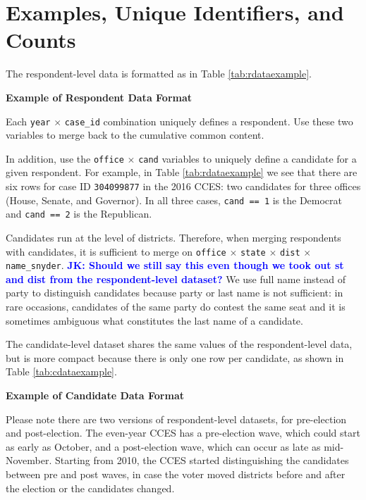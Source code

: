 \documentclass[12pt]{article}
\newcommand{\jkcomment}[1]{\textcolor{blue}{\textbf{JK: #1}}}
\begin{document}
\section{Examples, Unique Identifiers, and Counts}

The respondent-level data is formatted as in Table \ref{tab:rdataexample}.

\begin{table}[!h]
\caption{\textbf{Example of Respondent Data Format} \label{tab:rdataexample}}
\begin{adjustwidth}{-1cm}{-1cm}
\footnotesize

\end{adjustwidth}
\end{table}


Each \texttt{year} $\times$ \texttt{case\_id} combination uniquely defines a respondent. Use these two variables to merge back to the cumulative common content. 

In addition, use the \texttt{office} $\times$ \texttt{cand} variables to uniquely define a candidate for a given respondent. For example, in Table \ref{tab:rdataexample} we see that there are six rows for case ID \texttt{304099877} in the 2016 CCES: two candidates for three offices (House, Senate, and Governor).  In all three cases, \texttt{cand == 1} is the Democrat and \texttt{cand == 2} is the Republican.

Candidates run at the level of districts. Therefore, when merging respondents with candidates, it is sufficient to merge on \texttt{office} $\times$ \texttt{state} $\times$ \texttt{dist} $\times$ \texttt{name\_snyder}. \jkcomment{Should we still say this even though we took out st and dist from the respondent-level dataset?} We use full name instead of party to distinguish candidates because party or last name is not sufficient: in rare occasions, candidates of the same party do contest the same seat and it is sometimes ambiguous what constitutes the last name of a candidate.

The candidate-level dataset shares the same values of the respondent-level data, but is more compact because there is only one row per candidate, as shown in Table \ref{tab:cdataexample}.

\begin{table}[!h]
\caption{\textbf{Example of Candidate Data Format} \label{tab:cdataexample}}
\centering
\footnotesize

\end{table}


Please note there are two versions of respondent-level datasets, for pre-election and post-election. The even-year CCES has a pre-election wave, which could start as early as October, and a post-election wave, which can occur as late as mid-November. Starting from 2010, the CCES started distinguishing the candidates between pre and post waves, in case the voter moved districts before and after the election or the candidates changed.
 
\end{document}
